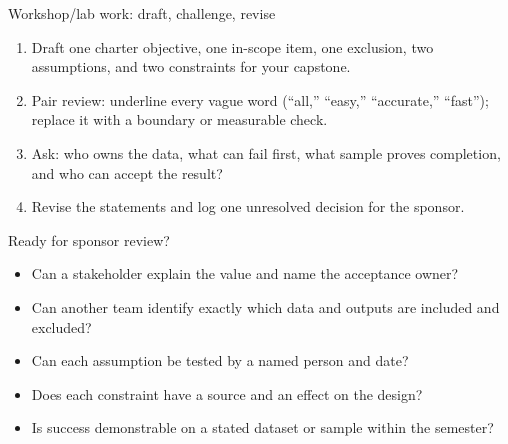 \documentclass[aspectratio=43,12pt]{beamer}
\begin{document}
\begin{frame}{Workshop/lab work: draft, challenge, revise}
\begin{enumerate}
\item Draft one charter objective, one in-scope item, one exclusion, two assumptions, and two constraints for your capstone.
\item Pair review: underline every vague word (``all,'' ``easy,'' ``accurate,'' ``fast''); replace it with a boundary or measurable check.
\item Ask: who owns the data, what can fail first, what sample proves completion, and who can accept the result?
\item Revise the statements and log one unresolved decision for the sponsor.
\end{enumerate}
\end{frame}

\begin{frame}{Ready for sponsor review?}
\begin{itemize}
\item Can a stakeholder explain the value and name the acceptance owner?
\item Can another team identify exactly which data and outputs are included and excluded?
\item Can each assumption be tested by a named person and date?
\item Does each constraint have a source and an effect on the design?
\item Is success demonstrable on a stated dataset or sample within the semester?
\end{itemize}
\end{frame}
\end{document}
